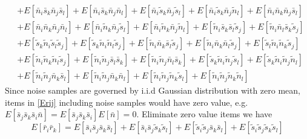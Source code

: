 \begin{equation}
\begin{split}
&+E[\bar{n}_i\bar{s}_k\bar{n}_j\bar{s}_l]+E[\bar{n}_i\bar{s}_k\bar{n}_j\bar{n}_l]+E[\bar{n}_i\tilde{s}_k\bar{n}_j\tilde{s}_l]+E[\bar{n}_i\tilde{s}_k\bar{n}_j\tilde{n}_l]+E[\bar{n}_i\bar{n}_k\bar{n}_j\bar{s}_l]\\
&+E[\bar{n}_i\bar{n}_k\bar{n}_j\bar{n}_l]+E[\bar{n}_i\tilde{n}_k\bar{n}_j\tilde{s}_l]+E[\bar{n}_i\tilde{n}_k\bar{n}_j\tilde{n}_l]+E[\tilde{n}_i\bar{s}_k\bar{s}_l\tilde{s}_j]+E[\tilde{n}_i\bar{n}_l\bar{s}_k\tilde{s}_j]\\
&+E[\tilde{s}_k\tilde{n}_i\tilde{s}_l\tilde{s}_j]+E[\tilde{s}_k\tilde{n}_i\tilde{n}_l\tilde{s}_j]+E[\tilde{n}_i\bar{n}_k\bar{s}_l\tilde{s}_j]+E[\tilde{n}_i\bar{n}_k\bar{n}_l\tilde{s}_j]+E[\tilde{s}_l\tilde{n}_i\tilde{n}_k\tilde{s}_j]\\
&+E[\tilde{n}_i\tilde{n}_k\tilde{n}_l\tilde{s}_j]+E[\tilde{n}_i\tilde{n}_j\bar{s}_l\bar{s}_k]+E[\tilde{n}_i\tilde{n}_j\bar{n}_l\bar{s}_k]+E[\tilde{s}_k\tilde{n}_i\tilde{n}_j\tilde{s}_l]+E[\tilde{s}_k\tilde{n}_i\tilde{n}_j\tilde{n}_l]\\
&+E[\tilde{n}_i\tilde{n}_j\bar{n}_k\bar{s}_l]+E[\tilde{n}_i\tilde{n}_j\bar{n}_k\bar{n}_l]+E[\tilde{n}_i\tilde{n}_j\tilde{n}_k\tilde{s}_l]+E[\tilde{n}_i\tilde{n}_j\tilde{n}_k\tilde{n}_l]
  \end{split}
  \label{Erij}
\end{equation}
Since noise samples are governed by i.i.d Gaussian distribution with zero mean, items in \eqref{Erij} including noise samples would have zero value, e.g. $E[\bar{s}_j\bar{s}_k\bar{s}_i\bar{n}] = E[\bar{s}_j\bar{s}_k\bar{s}_i]E[\bar{n}] = 0$. Eliminate zero value items we have 
\begin{equation}
  E[\bar{r}_i\bar{r}_k] = E[\bar{s}_i\bar{s}_j\bar{s}_k\bar{s}_l] + E[\bar{s}_i\bar{s}_j\tilde{s}_k\tilde{s}_l] + E[\tilde{s}_i\tilde{s}_j\bar{s}_k\bar{s}_l] + E[\tilde{s}_i\tilde{s}_j\tilde{s}_k\tilde{s}_l]
  \label{equ:Erirk}
\end{equation} 

